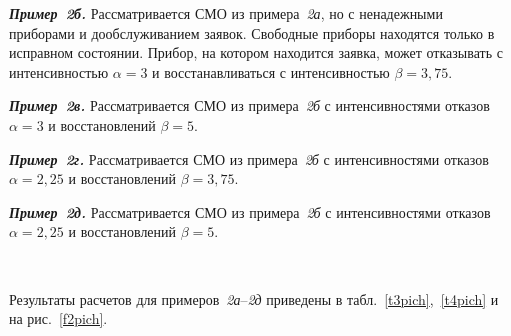 \begin{multicols}{2}
{\bfseries\textit{Пример~2б.}}
Рассматривается СМО из примера~\textit{2а}, но с ненадежными приборами и дообслуживанием заявок.
Свободные приборы находятся только в исправном состоянии.
Прибор, на котором находится заявка, может отказывать с интенсивностью $\alpha = 3$
и восстанавливаться с интенсивностью $\beta= 3{,}75$.

{\bfseries\textit{Пример~2в.}}
Рассматривается СМО из примера~\textit{2б} с интенсивностями отказов $\alpha = 3$
и восстановлений $\beta= 5$.

{\bfseries\textit{Пример~2г.}}
Рассматривается СМО из примера~\textit{2б} с интенсивностями отказов $\alpha = 2{,}25$
и восстановлений $\beta= 3{,}75$.

{\bfseries\textit{Пример~2д.}}
Рассматривается СМО из примера~\textit{2б} с интенсивностями отказов $\alpha = 2{,}25$
и восстановлений $\beta= 5$.

\begin{figure*} %
\vspace*{1pt}
\begin{center}
\mbox{%
\epsfxsize=162.45mm
}
\end{center}
\vspace*{-9pt}
\end{figure*}
Результаты расчетов для примеров~\textit{2а}--\textit{2д}
приведены в табл.~\ref{t3pich},~\ref{t4pich}
и на рис.~\ref{f2pich}.

\begin{table*}\small
\begin{center}
\vspace*{2ex}


\end{center}
\end{table*}
\end{multicols}

